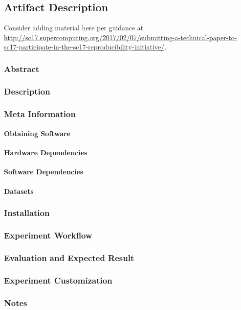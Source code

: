 \subsection{Artifact Description} \label{sec:appendix/artifacts}

Consider adding material here per guidance at
\url{http://sc17.supercomputing.org/2017/02/07/submitting-a-technical-paper-to-sc17-participate-in-the-sc17-reproducibility-initiative/}.

\subsubsection{Abstract}

\subsubsection{Description}

\subsubsection{Meta Information}

\paragraph{Obtaining Software}

\paragraph{Hardware Dependencies}

\paragraph{Software Dependencies}

\paragraph{Datasets}

\subsubsection{Installation}

\subsubsection{Experiment Workflow}

\subsubsection{Evaluation and Expected Result}

\subsubsection{Experiment Customization}

\subsubsection{Notes}
